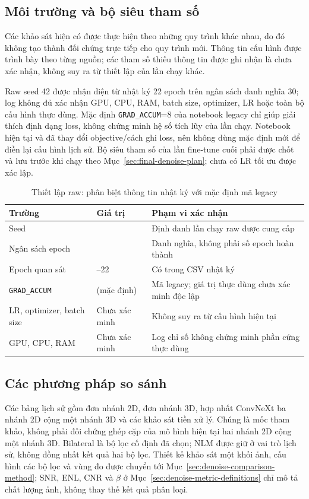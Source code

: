 \documentclass[14pt,a4paper,oneside]{extreport}
\begin{document}
\subsection{Môi trường và bộ siêu tham số}
Các khảo sát hiện có được thực hiện theo những quy trình khác nhau,
do đó không tạo thành đối chứng trực tiếp cho quy trình mới. Thông tin
cấu hình được trình bày theo từng nguồn; các tham số thiếu thông tin
được ghi nhận là chưa xác nhận, không suy ra từ thiết lập của lần chạy khác.

Raw seed 42 được nhận diện từ nhật ký 22 epoch trên ngân sách danh
nghĩa 30; log không đủ xác nhận GPU, CPU, RAM, batch size, optimizer,
LR hoặc toàn bộ cấu hình thực dùng. Mặc định \texttt{GRAD\_ACCUM}=8
của notebook legacy chỉ giúp giải thích định dạng loss, không chứng
minh hệ số tích lũy của lần chạy. Notebook hiện tại và
 đã thay đổi objective/cách ghi loss, nên
không dùng mặc định mới để điền lại cấu hình lịch sử. Bộ siêu tham số
của lần fine-tune cuối phải được chốt và lưu trước khi chạy theo
Mục~\ref{sec:final-denoise-plan}; chưa có LR tối ưu được xác lập.

\begin{table}[htbp]
  \centering
  \caption{Thiết lập raw: phân biệt thông tin nhật ký với mặc định mã legacy}
  \label{tab:raw-config-provenance}
  \begin{tabular}{@{}>{\RaggedRight\arraybackslash}p{}>{\RaggedRight\arraybackslash}p{}>{\RaggedRight\arraybackslash}p{}@{}}
    \toprule
    Trường & Giá trị & Phạm vi xác nhận\\
    \midrule
    Seed & 42 & Định danh lần chạy raw được cung cấp\\
    Ngân sách epoch & 30 & Danh nghĩa, không phải số epoch hoàn thành\\
    Epoch quan sát & 1--22 & Có trong CSV nhật ký\\
    \texttt{GRAD\_ACCUM} & 8 (mặc định) & Mã legacy; giá trị thực dùng chưa xác minh độc lập\\
    LR, optimizer, batch size & Chưa xác minh & Không suy ra từ cấu hình hiện tại\\
    GPU, CPU, RAM & Chưa xác minh & Log chỉ số không chứng minh phần cứng thực dùng\\
    \bottomrule
  \end{tabular}
\end{table}

\subsection{Các phương pháp so sánh}
Các bảng lịch sử gồm đơn nhánh 2D, đơn nhánh 3D, hợp nhất ConvNeXt
ba nhánh 2D cộng một nhánh 3D và các khảo sát tiền xử lý. Chúng là
mốc tham khảo, không phải đối chứng ghép cặp của mô hình hiện tại
hai nhánh 2D cộng một nhánh 3D. Bilateral là bộ lọc cố định đã chọn;
NLM được giữ ở vai trò lịch sử, không đồng nhất kết quả hai bộ lọc.
Thiết kế khảo sát một khối ảnh, cấu hình các bộ lọc và vùng đo được
chuyển tới Mục~\ref{sec:denoise-comparison-method}; SNR, ENL, CNR và
$\beta$ ở Mục~\ref{sec:denoise-metric-definitions} chỉ mô tả chất lượng
ảnh, không thay thế kết quả phân loại.
\end{document}
